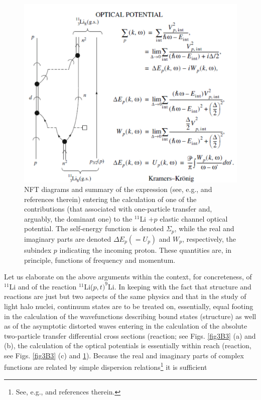 \begin{figure}
\centerline{\includegraphics*[width=15cm,angle=0]{nutshell/figs/fig3B4.pdf}}
\caption{NFT diagrams and summary of the expression (see, e.g., \cite{Mahaux:85} and references therein) entering the calculation of one of
the contributions (that associated with one-particle transfer and, arguably, the dominant one) to the $^{11}$Li $+ p$ elastic channel
optical potential. The self-energy function is denoted $\Sigma_p$, while the real and imaginary parts are denoted $\Delta E_p (=U_p)$ and $W_p$,
respectively, the subindex $p$ indicating the incoming proton. These quantities are, in principle, functions of frequency and
momentum.}\label{fig3B4}
\end{figure}
Let us elaborate on the above arguments within the context, for concreteness, of $^{11}$Li and of the reaction $^{11}$Li($p,t)^9$Li. In keeping with the fact that structure and reactions
are just but two aspects of the same physics
and that in the study of light halo nuclei, continuum
states are to be treated on, essentially, equal footing
in the calculation of the wavefunctions describing
bound states (structure) as well as of the asymptotic
distorted waves entering in the calculation of the absolute
two-particle transfer differential cross sections
(reaction; see Figs. \ref{fig3B3} (a) and (b), the calculation
of the optical potentials is essentially within reach
(reaction, see Figs. \ref{fig3B3} (c) and \ref{fig3B4}).
Because the real and imaginary parts of complex
functions are related by simple dispersion relations\footnote{See, e.g., \cite{Mahaux:85} and references therein.} it is sufficient
